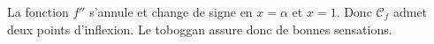 \documentclass[10pt]{article}
\begin{document}
\begin{enumerate}
\begin{enumerate}
\begin{center}
			\end{center}
		La fonction $f''$ s'annule et change de signe en $x=\alpha$ et $x=1$. Donc $\mathcal{C}_f$ admet deux points d'inflexion. Le toboggan assure donc de bonnes sensations.
\end{enumerate} 
	
\end{enumerate}

\bigskip
\end{document}
